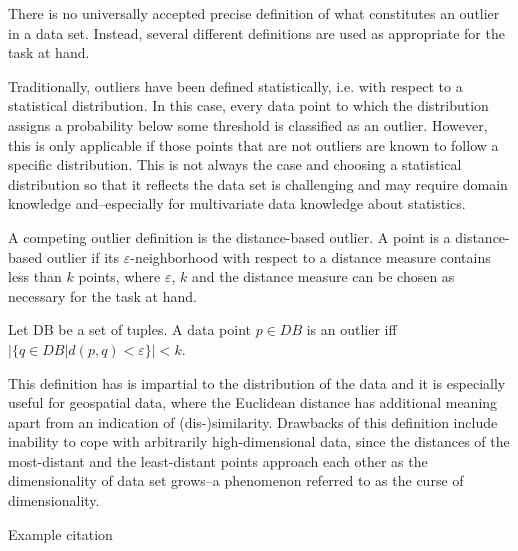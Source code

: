 \documentclass[runningheads]{llncs}
\begin{document}
There is no universally accepted precise definition of what constitutes an outlier in a data set. Instead, several different definitions are used as appropriate for the task at hand.

Traditionally, outliers have been defined statistically, i.e. with respect to a statistical distribution. In this case, every data point to which the distribution assigns a probability below some threshold is classified as an outlier. However, this is only applicable if those points that are not outliers are known to follow a specific distribution. This is not always the case and choosing a statistical distribution so that it reflects the data set is challenging and may require domain knowledge and--especially for multivariate data knowledge about statistics.

A competing outlier definition is the distance-based outlier. A point is a distance-based outlier if its $\varepsilon$-neighborhood with respect to a distance measure contains less than $k$ points, where $\varepsilon$, $k$ and the distance measure can be chosen as necessary for the task at hand.

\begin{definition}
    Let DB be a set of tuples. A data point $p\in DB$ is an outlier iff 
    $|\{q \in DB | d(p,q) < \varepsilon\}| < k$.
\end{definition}

This definition has is impartial to the distribution of the data and it is especially useful for geospatial data, where the Euclidean distance has additional meaning apart from an indication of (dis-)similarity. Drawbacks of this definition include inability to cope with arbitrarily high-dimensional data, since the distances of the most-distant and the least-distant points approach each other as the dimensionality of data set grows--a phenomenon referred to as the curse of dimensionality. %



Example citation \cite{DBLP:conf/civr/BeecksUS10}

%
%


  
\end{document}
